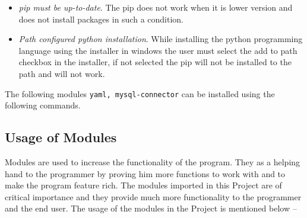 \documentclass[12pt, a4paper, titlepage, openany]{report}
\begin{document}
\begin{itemize}
\item \emph{pip must be up-to-date}. The pip does not work when it is lower version and does not install packages in such a condition.
\item \emph{Path configured python installation}. While installing the python programming language using the installer in windows the user must select the add to path checkbox in the installer, if not selected the pip will not be installed to the path and will not work.
\end{itemize}
The following modules \verb+yaml, mysql-connector+ can be installed using the following commands.
\begin{figure}
\centering
{}
\end{figure}

\subsection{Usage of Modules}
Modules are used to increase the functionality of the program. They as a helping hand to the programmer by proving him more functions to work with and to make the program feature rich. The modules imported in this Project are of critical importance and they provide much more functionality to the programmer and the end user. The usage of the modules in the Project is mentioned below --
\end{document}
